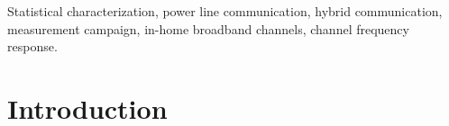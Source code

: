 \documentclass[journal]{IEEEtran}
\begin{document}
\begin{IEEEkeywords}
Statistical characterization, power line communication, hybrid communication, measurement campaign, in-home broadband channels, channel frequency response.
\end{IEEEkeywords}

\IEEEpeerreviewmaketitle

\section{Introduction}

\end{document}
